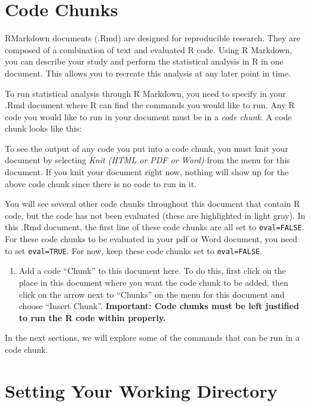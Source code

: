 \documentclass[]{article}
\providecommand{\tightlist}{%
  \setlength{\itemsep}{0pt}\setlength{\parskip}{0pt}}
\begin{document}
\hypertarget{code-chunks}{%
\section{Code Chunks}\label{code-chunks}}

RMarkdown documents (.Rmd) are designed for reproducible research. They
are composed of a combination of text and evaluated R code. Using R
Markdown, you can describe your study and perform the statistical
analysis in R in one document. This allows you to recreate this analysis
at any later point in time.

To run statistical analysis through R Markdown, you need to specify in
your .Rmd document where R can find the commands you would like to run.
Any R code you would like to run in your document must be in a
\emph{code chunk}. A code chunk looks like this:

To see the output of any code you put into a code chunk, you must knit
your document by selecting \emph{Knit (HTML or PDF or Word)} from the
menu for this document. If you knit your document right now, nothing
will show up for the above code chunk since there is no code to run in
it.

You will see several other code chunks throughout this document that
contain R code, but the code has not been evaluated (these are
highlighted in light gray). In this .Rmd document, the first line of
these code chunks are all set to \texttt{eval=FALSE}. For these code
chunks to be evaluated in your pdf or Word document, you need to set
\texttt{eval=TRUE}. For now, keep these code chunks set to
\texttt{eval=FALSE}.

\begin{enumerate}
\def\labelenumi{\arabic{enumi}.}
\tightlist
\item
  Add a code ``Chunk'' to this document here. To do this, first click on
  the place in this document where you want the code chunk to be added,
  then click on the arrow next to ``Chunks'' on the menu for this
  document and choose ``Insert Chunk''. \textbf{Important: Code chunks
  must be left justified to run the R code within properly.}
\end{enumerate}

In the next sections, we will explore some of the commands that can be
run in a code chunk.

\hypertarget{setting-your-working-directory}{%
\section{Setting Your Working
Directory}\label{setting-your-working-directory}}
\end{document}
